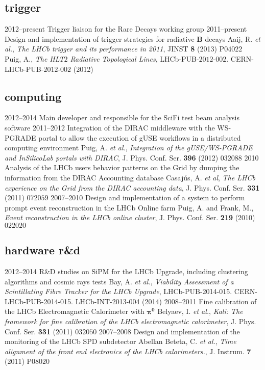 \subsection{trigger}
    \cventry
    {2012--present}
    {Trigger liaison for the Rare Decays working group}
    {}
    {}
    \cventry
    {2011--present}
    {Design and implementation of trigger strategies for radiative $\mathbf{B}$ decays}
    {}
    {Aaij, R. \textit{et al.}, \textit{The LHCb trigger and its performance in 2011}, JINST \textbf{8} (2013) P$04022$\\
     Puig, A., \textit{The HLT$2$ Radiative Topological Lines}, LHCb-PUB-$2012$-$002$. CERN-LHCb-PUB-$2012$-$002$ (2012)}

\subsection{computing}
    \cventry
    {2012--2014}
    {Main developer and responsible for the SciFi test beam analysis software}
    {}
    {}
    \cventry
    {2011--2012}
    {Integration of the DIRAC middleware with the WS-PGRADE portal to allow the execution of gUSE workflows in a distributed computing environment}
    {}
    {Puig, A. \emph{et al.}, \textit{Integration of the gUSE/WS-PGRADE and InSilicoLab portals with DIRAC}, J. Phys. Conf. Ser. \textbf{396} (2012) $032088$}
    \cventry
    {2010}
    {Analysis of the LHCb users behavior patterns on the Grid by dumping the information from the DIRAC Accounting database}
    {}
    {Casaj{\'u}s, A. \emph{et al}, \textit{The LHCb experience on the Grid from the DIRAC accounting data}, J. Phys. Conf. Ser. \textbf{331} (2011) $072059$}
    \cventry
    {2007--2010}
    {Design and implementation of a system to perform prompt event reconstruction in the LHCb Online farm}
    {}
    {Puig, A. and Frank, M., \textit{Event reconstruction in the LHCb online cluster}, J. Phys. Conf. Ser. \textbf{219} (2010) $022020$}

\subsection{hardware r\&d}
    \cventry
    {2012--2014}
    {R\&D studies on SiPM for the LHCb Upgrade, including clustering algorithms and cosmic rays tests}
    {}
    {Bay, A. \emph{et al.}, \textit{Viability Assessment of a Scintillating Fibre Tracker for the LHCb Upgrade}, LHCb-PUB-2014-015. CERN-LHCb-PUB-2014-015. LHCb-INT-2013-004 (2014)}
    \cventry
    {2008--2011}
    {Fine calibration of the LHCb Electromagnetic Calorimeter with $\mathbf{\pi^0}$}
    {}
    {Belyaev, I. \emph{et al.}, \textit{Kali: The framework for fine calibration of the LHCb electromagnetic calorimeter}, J. Phys. Conf. Ser. \textbf{331} (2011) $032050$}
    \cventry
    {2007--2008}
    {Design and implementation of the monitoring of the LHCb SPD subdetector}
    {}
    {Abellan Beteta, C. \emph{et al.}, \textit{Time alignment of the front end electronics of the LHCb calorimeters.}, J. Instrum. \textbf{7} (2011) P$08020$}

